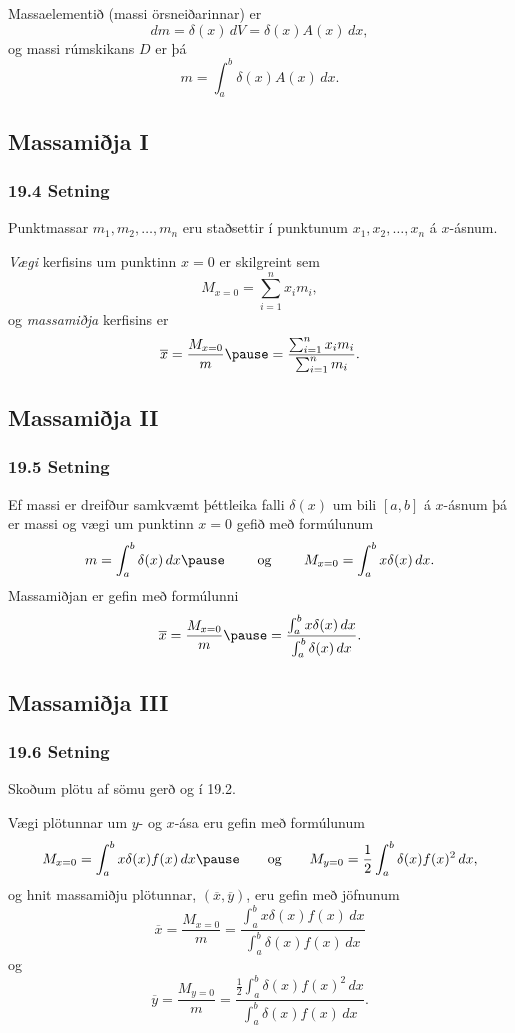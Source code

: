 Massaelementið (massi örsneiðarinnar) er
$$dm=\delta(x)\, dV = \delta(x) A(x)\, dx,$$
\pause
og massi rúmskikans $D$ er þá
$$m=\int_a^b \delta(x)A(x)\, dx.$$
 


\subsection[t]{Massamiðja I}
 \subsubsection{19.4 Setning}
Punktmassar $m_1, m_2, \ldots, m_n$ eru staðsettir í punktunum $x_1,
x_2, \ldots, x_n$ á $x$-ásnum. \pause


{\em Vægi} kerfisins um punktinn $x=0$ er skilgreint sem 
$$M_{x=0}=\sum_{i=1}^n x_im_i,$$ \pause
og \emph{massamiðja} kerfisins er  \pause
$$\overline{x}=\frac{M_{x=0}}{m} \pause=
\frac{\sum_{i=1}^n x_im_i}{\sum_{i=1}^n m_i}.$$
 


\subsection[t]{Massamiðja II}
 \subsubsection{19.5 Setning}
Ef massi er dreifður samkvæmt þéttleika
falli $\delta(x)$ um bili $[a, b]$ á $x$-ásnum  \pause
þá er massi og vægi um
punktinn $x=0$ gefið með formúlunum  \pause
$$
m=\int_a^b \delta(x)\,dx \pause
\qquad\mbox{ og }\qquad 
M_{x=0}= \int_a^b x\delta(x)\,dx.
$$
 \pause
Massamiðjan er gefin með formúlunni
$$\overline{x}=\frac{M_{x=0}}{m}  \pause =
\frac{\int_a^b x\delta(x)\,dx}{\int_a^b \delta(x)\,dx}.$$
 


\subsection[t]{Massamiðja III}
 \subsubsection{19.6 Setning}
Skoðum plötu af sömu gerð og í 19.2. \pause

Vægi plötunnar um $y$- og $x$-ása eru gefin með formúlunum
$$M_{x=0}=\int_a^b x\delta(x)f(x)\,dx \pause
\qquad\mbox{og}\qquad
M_{y=0}=\frac{1}{2}\int_a^b \delta(x)f(x)^2\,dx,$$
\pause
og hnit massamiðju plötunnar, $(\overline{x}, \overline{y})$, eru
gefin með jöfnunum
$$\overline{x}=\frac{M_{x=0}}{m}=
\frac{\int_a^b x\delta(x)f(x)\,dx}{\int_a^b \delta(x)f(x)\,dx}
$$
\pause
og
$$
\overline{y}=\frac{M_{y=0}}{m}=
\frac{\frac{1}{2}\int_a^b \delta(x)f(x)^2\,dx}{\int_a^b
  \delta(x)f(x)\,dx}.$$
 


